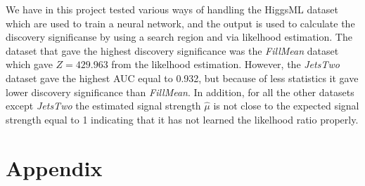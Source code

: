 \documentclass[../../main/main.tex]{subfiles}
\begin{document}
We have in this project tested various ways of handling the HiggsML dataset which are used to train a neural network, and the output is used to calculate the discovery significanse by using a search region and via likelhood estimation. The dataset that gave the highest discovery significance was the \emph{FillMean} dataset which gave \(Z=429.963\) from the likelhood estimation. However, the \emph{JetsTwo} dataset gave the highest AUC equal to 0.932, but because of less statistics it gave lower discovery significance than \emph{FillMean}. In addition, for all the other datasets except \emph{JetsTwo} the estimated signal strength \(\hat{\mu}\) is not close to the expected signal strength equal to 1 indicating that it has not learned the likelhood ratio properly.


\section{Appendix}
\label{sec:appendix}
\end{document}
